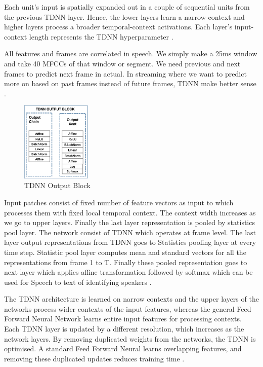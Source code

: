 Each unit's input is spatially expanded out in a couple of sequential units from the previous TDNN layer. Hence, the lower layers learn a narrow-context and higher layers process a broader temporal-context activations. Each layer's input-context length represents the TDNN hyperparameter \cite{kreyssig_improved_2018}.

All features and frames are correlated in speech. We simply make a 25ms window and take 40 MFCCs of that window or segment. We need previous and next frames to predict next frame in actual. In streaming where we want to predict more on based on past frames instead of future frames, TDNN make better sense \cite{liu_time_2019}. 

\begin{figure}[h!]
    \centering
    \includegraphics[width=0.3\textwidth]{img/TDNNOUTPUT.png}
    \caption{TDNN Output Block}
    \label{fig:TDNN-OUTPUT-BLOC}
\end{figure}


Input patches consist of fixed number of feature vectors as input to which processes them with fixed local temporal context. The context width increases as we go to upper layers. Finally the last layer representation is pooled by statistics pool layer. The network consist of TDNN which operates at frame level. The last layer output representations from TDNN goes to Statistics pooling layer at every time step. Statistic pool layer computes mean and standard vectors for all the representations from frame 1 to T. Finally these pooled representation goes to next layer which applies affine transformation followed by softmax which can be used for Speech to text of identifying speakers \cite{liu_time_2019}. 

The TDNN architecture is learned on narrow contexts and the upper layers of the networks process wider contexts of the input features, whereas the general Feed Forward Neural Network learns entire input features for processing contexts. Each TDNN layer is updated by a different resolution, which increases as the network layers. By removing duplicated weights from the networks, the TDNN is optimised. A standard Feed Forward Neural learns overlapping features, and removing these duplicated updates reduces training time \cite{yeh_taiwanese_2020}. 

